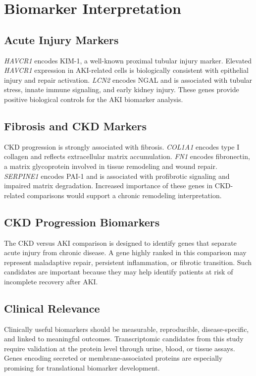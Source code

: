 \chapter{Biomarker Interpretation}
\section{Acute Injury Markers}
\textit{HAVCR1} encodes KIM-1, a well-known proximal tubular injury marker. Elevated \textit{HAVCR1} expression in AKI-related cells is biologically consistent with epithelial injury and repair activation. \textit{LCN2} encodes NGAL and is associated with tubular stress, innate immune signaling, and early kidney injury. These genes provide positive biological controls for the AKI biomarker analysis.

\section{Fibrosis and CKD Markers}
CKD progression is strongly associated with fibrosis. \textit{COL1A1} encodes type I collagen and reflects extracellular matrix accumulation. \textit{FN1} encodes fibronectin, a matrix glycoprotein involved in tissue remodeling and wound repair. \textit{SERPINE1} encodes PAI-1 and is associated with profibrotic signaling and impaired matrix degradation. Increased importance of these genes in CKD-related comparisons would support a chronic remodeling interpretation.

\section{CKD Progression Biomarkers}
The CKD versus AKI comparison is designed to identify genes that separate acute injury from chronic disease. A gene highly ranked in this comparison may represent maladaptive repair, persistent inflammation, or fibrotic transition. Such candidates are important because they may help identify patients at risk of incomplete recovery after AKI.

\section{Clinical Relevance}
Clinically useful biomarkers should be measurable, reproducible, disease-specific, and linked to meaningful outcomes. Transcriptomic candidates from this study require validation at the protein level through urine, blood, or tissue assays. Genes encoding secreted or membrane-associated proteins are especially promising for translational biomarker development.
